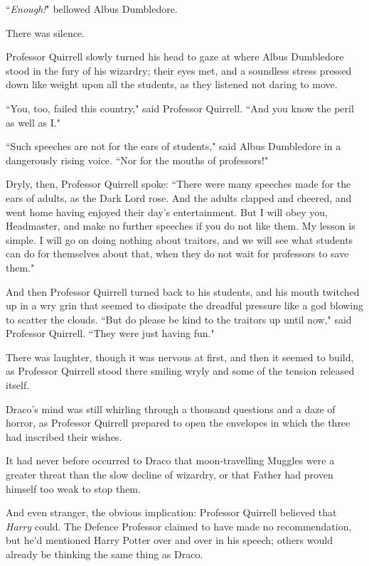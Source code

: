``\emph{Enough!}" bellowed Albus Dumbledore.

There was silence.

Professor Quirrell slowly turned his head to gaze at where Albus Dumbledore stood in the fury of his wizardry; their eyes met, and a soundless stress pressed down like weight upon all the students, as they listened not daring to move.

``You, too, failed this country," said Professor Quirrell. ``And you know the peril as well as I."

``Such speeches are not for the ears of students," said Albus Dumbledore in a dangerously rising voice. ``Nor for the mouths of professors!"

Dryly, then, Professor Quirrell spoke: ``There were many speeches made for the ears of adults, as the Dark Lord rose. And the adults clapped and cheered, and went home having enjoyed their day's entertainment. But I will obey you, Headmaster, and make no further speeches if you do not like them. My lesson is simple. I will go on doing nothing about traitors, and we will see what students can do for themselves about that, when they do not wait for professors to save them."

And then Professor Quirrell turned back to his students, and his mouth twitched up in a wry grin that seemed to dissipate the dreadful pressure like a god blowing to scatter the clouds. ``But do please be kind to the traitors up until now," said Professor Quirrell. ``They were just having fun."

There was laughter, though it was nervous at first, and then it seemed to build, as Professor Quirrell stood there smiling wryly and some of the tension released itself.

\later

Draco's mind was still whirling through a thousand questions and a daze of horror, as Professor Quirrell prepared to open the envelopes in which the three had inscribed their wishes.

It had never before occurred to Draco that moon-travelling Muggles were a greater threat than the slow decline of wizardry, or that Father had proven himself too weak to stop them.

And even stranger, the obvious implication: Professor Quirrell believed that \emph{Harry} could. The Defence Professor claimed to have made no recommendation, but he'd mentioned Harry Potter over and over in his speech; others would already be thinking the same thing as Draco.

